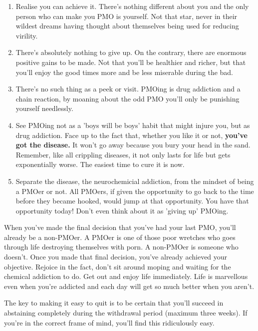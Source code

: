 \documentclass[easypeasy]{subfiles}
\begin{document}
\begin{enumerate}
  \item Realise you can achieve it. There's nothing different about you and the only person who can make you PMO is yourself. Not that star, never in their wildest dreams having thought about themselves being used for reducing virility.

  \item There's absolutely nothing to give up. On the contrary, there are enormous positive gains to be made. Not that you'll be healthier and richer, but that you'll enjoy the good times more and be less miserable during the bad.

  \item There's no such thing as a peek or visit. PMOing is drug addiction and a chain reaction, by moaning about the odd PMO you'll only be punishing yourself needlessly.

  \item See PMOing not as a 'boys will be boys' habit that might injure you, but as drug addiction. Face up to the fact that, whether you like it or not, \textbf{you've got the disease.} It won't go away because you bury your head in the sand. Remember, like all crippling diseases, it not only lasts for life but gets exponentially worse. The easiest time to cure it is now.

  \item Separate the disease, the neurochemicial addiction, from the mindset of being a PMOer or not. All PMOers, if given the opportunity to go back to the time before they became hooked, would jump at that opportunity. You have that opportunity today! Don't even think about it as 'giving up' PMOing.

\end{enumerate}

When you've made the final decision that you've had your last PMO, you'll already be a non-PMOer. A PMOer is one of those poor wretches who goes through life destroying themselves with porn. A non-PMOer is someone who doesn't. Once you made that final decision, you've already achieved your objective. Rejoice in the fact, don't sit around moping and waiting for the chemical addiction to do. Get out and enjoy life immediately. Life is marvellous even when you're addicted and each day will get so much better when you aren't.

The key to making it easy to quit is to be certain that you'll succeed in abstaining completely during the withdrawal period (maximum three weeks). If you're in the correct frame of mind, you'll find this ridiculously easy.
\end{document}
